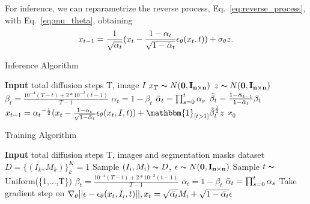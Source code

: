 \documentclass[10pt,twocolumn,letterpaper]{article}
\begin{document}
For inference, we can reparametrize the reverse process, Eq.~\ref{eq:reverse_process}, with Eq.~\ref{eq:mu_theta}, obtaining
\begin{equation}
    x_{t-1} 
    = 
    \frac{1}{\sqrt{\alpha_t}}(x_t - \frac{1-\alpha_t}{\sqrt{1-\Bar{\alpha}_t}}\epsilon_\theta(x_t,t)) + \sigma_\theta z.
\label{eq:reverse_process_rep}
\end{equation}


\begin{table}[t]
\begin{minipage}[t]{0.50\textwidth}
\begin{algorithm}[H]
    \caption{Inference Algorithm}
    \begin{algorithmic}
        \State \textbf{Input} total diffusion steps T, image $I$
        \State $x_T \thicksim N(\mathbf{0},\mathbf{I_{n\times n}})$
                \State $z \thicksim N(\mathbf{0},\mathbf{I_{n\times n}})$
            \State $\beta_t=\frac{10^{-4}(T-t) + 2*10^{-2}(t-1)}{T-1}$
            \State $\alpha_t  = 1-\beta_t$
            \State $\Bar{\alpha}_t = \prod^t_{s=0}\alpha_s$
            \State $\tilde{\beta}_t = \frac{1-\Bar{\alpha}_{t-1}}{1-\Bar{\alpha}_t}\beta_t$
            \State $x_{t-1} = {\alpha_t}^{-\scriptscriptstyle\frac{1}{2}}(x_t - \frac{1-\alpha_t}{\sqrt{1-\Bar{\alpha}_t}}\epsilon_\theta(x_t,I,t)) +  \mathbbm{1}_{[t > 1]}{\tilde{\beta}_t}^{\scriptscriptstyle\frac{1}{2}} z$
        \EndFor
        \State \Return $x_0$
    \end{algorithmic}
\label{alg:Inference}
\end{algorithm}
\end{minipage}

\begin{minipage}[t]{0.46\textwidth}
\begin{algorithm}[H]
    \caption{Training Algorithm}
    \begin{algorithmic}
        \State \textbf{Input} total diffusion steps T, images and segmentation masks dataset $D = \{(I_k,M_k)\}^K_k=1$
        \Repeat
            \State Sample $(I_i,M_i) \thicksim D$, $\epsilon \thicksim N(\mathbf{0},\mathbf{I_{n\times n}})$
            \State Sample $t \thicksim $ Uniform(\{1,...,T\})
            \State $\beta_t=\frac{10^{-4}(T-t) + 2*10^{-2}(t-1)}{T-1}$
            \State $\alpha_t  = 1-\beta_t$
            \State $\Bar{\alpha}_t = \prod^t_{s=0}\alpha_s$
            \State Take gradient step on $\nabla_\theta|| \epsilon - \epsilon_\theta (x_t,I_i,t)||, x_t=\sqrt{\Bar{\alpha_t}}M_i + \sqrt{1-\Bar{\alpha_t}}\epsilon$
    \end{algorithmic}
\label{alg:Training}
\end{algorithm}
\end{minipage}
\end{table}
\end{document}
